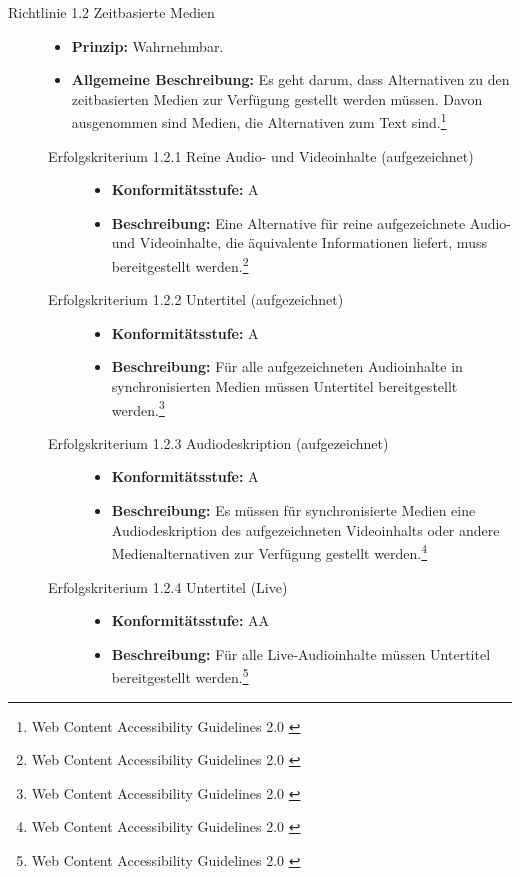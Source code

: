 \begin{description}
	\item[Richtlinie 1.2 Zeitbasierte Medien]\hfill
	\begin{itemize}
		\item \textbf{Prinzip:} Wahrnehmbar.
		\item \textbf{Allgemeine Beschreibung:} Es geht darum, dass Alternativen zu den zeitbasierten Medien zur Verfügung gestellt werden müssen. Davon ausgenommen sind 
		Medien, die Alternativen zum Text sind.\footnote{Web Content Accessibility Guidelines 2.0 \cite{WCAG2.0}}
	\end{itemize}
	
	\begin{description}
		\item[Erfolgskriterium 1.2.1 Reine Audio- und Videoinhalte (aufgezeichnet)]\hfill
		\begin{itemize}
			\item \textbf{Konformitätsstufe:} A
			\item \textbf{Beschreibung:} Eine Alternative für reine aufgezeichnete Audio- und Videoinhalte, die äquivalente Informationen 
			liefert, muss bereitgestellt werden.\footnote{Web Content Accessibility Guidelines 2.0 \cite{WCAG2.0}}
		\end{itemize}
			
		\item[Erfolgskriterium 1.2.2 Untertitel (aufgezeichnet)]\hfill
		\begin{itemize}
			\item \textbf{Konformitätsstufe:} A
			\item \textbf{Beschreibung:} Für alle aufgezeichneten Audioinhalte in synchronisierten Medien müssen Untertitel bereitgestellt 
			werden.\footnote{Web Content Accessibility Guidelines 2.0 \cite{WCAG2.0}}
		\end{itemize}
			
		\item[Erfolgskriterium 1.2.3 Audiodeskription (aufgezeichnet)]\hfill
		\begin{itemize}
			\item \textbf{Konformitätsstufe:} A
			\item \textbf{Beschreibung:} Es müssen für synchronisierte Medien eine Audiodeskription des aufgezeichneten Videoinhalts oder andere 
			Medienalternativen zur Verfügung gestellt werden.\footnote{Web Content Accessibility Guidelines 2.0 \cite{WCAG2.0}}
		\end{itemize}
			
		\item[Erfolgskriterium 1.2.4 Untertitel (Live)]\hfill
		\begin{itemize}
			\item \textbf{Konformitätsstufe:} AA
			\item \textbf{Beschreibung:} Für alle Live-Audioinhalte müssen Untertitel bereitgestellt werden.\footnote{Web Content Accessibility Guidelines 2.0 \cite{WCAG2.0}}
		\end{itemize}
			

\end{description}
\end{description}
